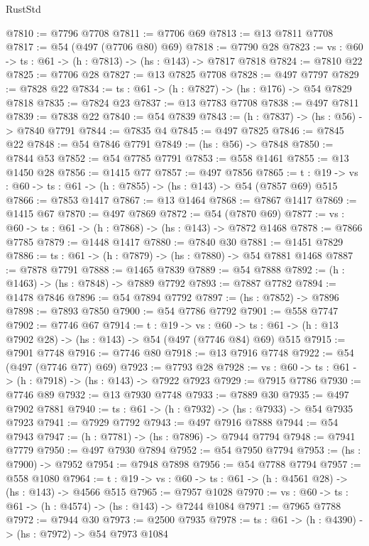 \begin{lexlean}{RustStd}
\begin{coremodule}
@7810 := @7796 @7708
@7811 := @7706 @69
@7813 := @13 @7811 @7708
@7817 := @54 (@497 (@7706 @80) @69)
@7818 := @7790 @28
@7823 := {vs : @60} -> {ts : @61} -> (h : @7813) -> (hs : @143) -> @7817 @7818
@7824 := @7810 @22
@7825 := @7706 @28
@7827 := @13 @7825 @7708
@7828 := @497 @7797
@7829 := @7828 @22
@7834 := {ts : @61} -> (h : @7827) -> (hs : @176) -> @54 @7829 @7818
@7835 := @7824 @23
@7837 := @13 @7783 @7708
@7838 := @497 @7811
@7839 := @7838 @22
@7840 := @54 @7839
@7843 := (h : @7837) -> (hs : @56) -> @7840 @7791
@7844 := @7835 @4
@7845 := @497 @7825
@7846 := @7845 @22
@7848 := @54 @7846 @7791
@7849 := (hs : @56) -> @7848
@7850 := @7844 @53
@7852 := @54 @7785 @7791
@7853 := @558 @1461
@7855 := @13 @1450 @28
@7856 := @1415 @77
@7857 := @497 @7856
@7865 := {t : @19} -> {vs : @60} -> {ts : @61} -> (h : @7855) -> (hs : @143) -> @54 (@7857 @69) @515
@7866 := @7853 @1417
@7867 := @13 @1464
@7868 := @7867 @1417
@7869 := @1415 @67
@7870 := @497 @7869
@7872 := @54 (@7870 @69)
@7877 := {vs : @60} -> {ts : @61} -> (h : @7868) -> (hs : @143) -> @7872 @1468
@7878 := @7866 @7785
@7879 := @1448 @1417
@7880 := @7840 @30
@7881 := @1451 @7829
@7886 := {ts : @61} -> (h : @7879) -> (hs : @7880) -> @54 @7881 @1468
@7887 := @7878 @7791
@7888 := @1465 @7839
@7889 := @54 @7888
@7892 := (h : @1463) -> (hs : @7848) -> @7889 @7792
@7893 := @7887 @7782
@7894 := @1478 @7846
@7896 := @54 @7894 @7792
@7897 := (hs : @7852) -> @7896
@7898 := @7893 @7850
@7900 := @54 @7786 @7792
@7901 := @558 @7747
@7902 := @7746 @67
@7914 := {t : @19} ->
  {vs : @60} -> {ts : @61} -> (h : @13 @7902 @28) -> (hs : @143) -> @54 (@497 (@7746 @84) @69) @515
@7915 := @7901 @7748
@7916 := @7746 @80
@7918 := @13 @7916 @7748
@7922 := @54 (@497 (@7746 @77) @69)
@7923 := @7793 @28
@7928 := {vs : @60} -> {ts : @61} -> (h : @7918) -> (hs : @143) -> @7922 @7923
@7929 := @7915 @7786
@7930 := @7746 @89
@7932 := @13 @7930 @7748
@7933 := @7889 @30
@7935 := @497 @7902 @7881
@7940 := {ts : @61} -> (h : @7932) -> (hs : @7933) -> @54 @7935 @7923
@7941 := @7929 @7792
@7943 := @497 @7916 @7888
@7944 := @54 @7943
@7947 := (h : @7781) -> (hs : @7896) -> @7944 @7794
@7948 := @7941 @7779
@7950 := @497 @7930 @7894
@7952 := @54 @7950 @7794
@7953 := (hs : @7900) -> @7952
@7954 := @7948 @7898
@7956 := @54 @7788 @7794
@7957 := @558 @1080
@7964 := {t : @19} -> {vs : @60} -> {ts : @61} -> (h : @4561 @28) -> (hs : @143) -> @4566 @515
@7965 := @7957 @1028
@7970 := {vs : @60} -> {ts : @61} -> (h : @4574) -> (hs : @143) -> @7244 @1084
@7971 := @7965 @7788
@7972 := @7944 @30
@7973 := @2500 @7935
@7978 := {ts : @61} -> (h : @4390) -> (hs : @7972) -> @54 @7973 @1084

\end{coremodule}
\end{lexlean}
